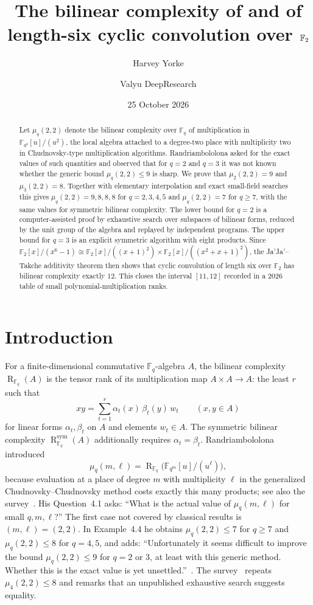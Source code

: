 \documentclass[11pt]{amsart}
\title[The bilinear complexity of \Fqqu{} and of \Csix]{The bilinear complexity of \texorpdfstring{\Fqqu}{Fq2[u]/(u2)} and of length-six cyclic convolution over \texorpdfstring{$\F_2$}{F2}}
\author{Harvey Yorke}
\author{Valyu DeepResearch}
\date{25 October 2026}
\theoremstyle{definition}
\theoremstyle{remark}
\newcommand{\F}{\mathbb F}
\newcommand{\R}{\operatorname{R}}
\newcommand{\Rsym}{\operatorname{R}^{\mathrm{sym}}}
\begin{document}
\raggedbottom
\begin{abstract}
Let $\mu_q(2,2)$ denote the bilinear complexity over $\F_q$ of multiplication in $\F_{q^2}[u]/(u^2)$, the local algebra attached to a degree-two place with multiplicity two in Chudnovsky-type multiplication algorithms. Randriambololona asked for the exact values of such quantities and observed that for $q=2$ and $q=3$ it was not known whether the generic bound $\mu_q(2,2)\le 9$ is sharp. We prove that $\mu_2(2,2)=9$ and $\mu_3(2,2)=8$. Together with elementary interpolation and exact small-field searches this gives $\mu_q(2,2)=9,8,8,8$ for $q=2,3,4,5$ and $\mu_q(2,2)=7$ for $q\ge7$, with the same values for symmetric bilinear complexity. The lower bound for $q=2$ is a computer-assisted proof by exhaustive search over subspaces of bilinear forms, reduced by the unit group of the algebra and replayed by independent programs. The upper bound for $q=3$ is an explicit symmetric algorithm with eight products. Since $\F_2[x]/(x^6-1)\cong\F_2[x]/((x+1)^2)\times\F_2[x]/((x^2+x+1)^2)$, the Ja'Ja'--Takche additivity theorem then shows that cyclic convolution of length six over $\F_2$ has bilinear complexity exactly $12$. This closes the interval $[11,12]$ recorded in a 2026 table of small polynomial-multiplication ranks.
\end{abstract}
\maketitle

\section{Introduction}

For a finite-dimensional commutative $\F_q$-algebra $A$, the bilinear complexity $\R_{\F_q}(A)$ is the tensor rank of its multiplication map $A\times A\to A$: the least $r$ such that
\[
 xy=\sum_{t=1}^r \alpha_t(x)\,\beta_t(y)\,w_t\qquad(x,y\in A)
\]
for linear forms $\alpha_t,\beta_t$ on $A$ and elements $w_t\in A$. The symmetric bilinear complexity $\Rsym_{\F_q}(A)$ additionally requires $\alpha_t=\beta_t$. Randriambololona~\cite{Randriambololona2012} introduced
\[
 \mu_q(m,\ell)=\R_{\F_q}\bigl(\F_{q^m}[u]/(u^\ell)\bigr),
\]
because evaluation at a place of degree $m$ with multiplicity $\ell$ in the generalized Chudnovsky--Chudnovsky method costs exactly this many products; see also the survey~\cite{BalletSurvey}. His Question~4.1 asks: ``What is the actual value of $\mu_q(m,\ell)$ for small $q,m,\ell$?'' The first case not covered by classical results is $(m,\ell)=(2,2)$. In Example~4.4 he obtains $\mu_q(2,2)\le7$ for $q\ge7$ and $\mu_q(2,2)\le8$ for $q=4,5$, and adds: ``Unfortunately it seems difficult to improve the bound $\mu_q(2,2)\le 9$ for $q=2$ or $3$, at least with this generic method. Whether this is the exact value is yet unsettled.''~\cite[Example~4.4]{Randriambololona2012}. The survey~\cite[\S8.2]{BalletSurvey} repeats $\mu_4(2,2)\le8$ and remarks that an unpublished exhaustive search suggests equality.
\end{document}

